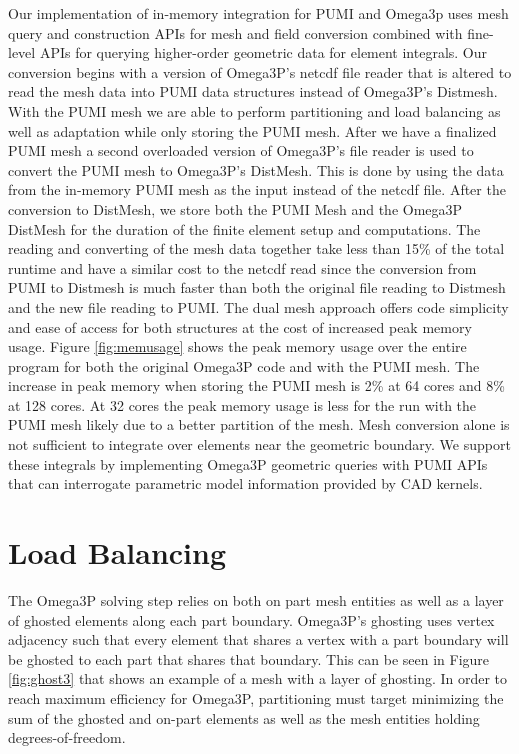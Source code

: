 \documentclass[a4paper]{article}
\begin{document}
Our implementation of in-memory integration for PUMI and Omega3p uses
mesh query and construction APIs for mesh and field conversion combined with
fine-level APIs for querying higher-order geometric data for element
integrals. 
Our conversion begins with a version of Omega3P's netcdf file reader that is altered 
to read the mesh data into PUMI data structures instead of Omega3P's Distmesh. With 
the PUMI mesh we are able to perform partitioning and load balancing as well as adaptation 
while only storing the PUMI mesh. After we have a finalized PUMI mesh a second 
overloaded version of Omega3P's file reader is used to convert the PUMI mesh to 
Omega3P's DistMesh. This is done by using the data from the in-memory PUMI mesh as the 
input instead of the netcdf file. After the conversion to DistMesh, we store both the 
PUMI Mesh and the Omega3P DistMesh for the duration of the finite element setup and 
computations. The reading and converting of the mesh data together take less than 15\% 
of the total runtime and have a similar cost to the netcdf read since the conversion 
from PUMI to Distmesh is much faster than both the original file reading to Distmesh 
and the new file reading to PUMI. 
The dual mesh approach offers code simplicity and 
ease of access for both structures at the cost of increased peak memory usage. 
Figure \ref{fig:memusage} shows the peak memory usage over the entire program for both
the original Omega3P code and with the PUMI mesh. The increase in peak memory when 
storing the PUMI mesh is 2\% at 64 cores and 8\% at 128 cores. At 32 cores the 
peak memory usage is less for the run with the PUMI mesh likely due to a better 
partition of the mesh. 
Mesh conversion alone is not sufficient to integrate over elements near the
geometric boundary.
We support these integrals by implementing Omega3P geometric queries with PUMI
APIs that can interrogate parametric model information provided by CAD
kernels.

\section{Load Balancing}\label{sec:lb}

The Omega3P solving step relies on both on part mesh entities as well as a layer of 
ghosted elements along each part boundary. Omega3P's ghosting uses vertex adjacency such
that every element that shares a vertex with a part boundary will be ghosted to each part that shares that boundary. This can be seen in Figure \ref{fig:ghost3} that shows an 
example of a mesh with a layer of ghosting. In order to reach maximum efficiency
for Omega3P, partitioning must target minimizing the sum of the 
ghosted and on-part elements as well as the mesh entities holding degrees-of-freedom.
\end{document}
